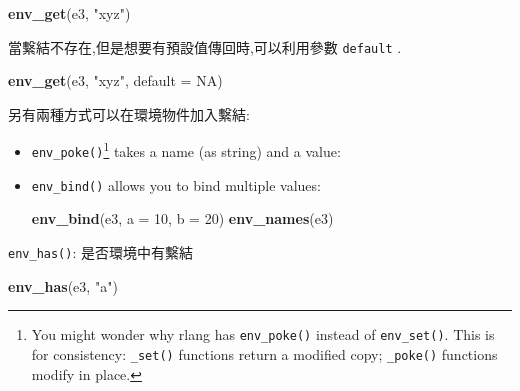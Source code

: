 \documentclass[]{book}
\newenvironment{Shaded}{\begin{snugshade}}{\end{snugshade}}
\newcommand{\KeywordTok}[1]{\textcolor[rgb]{0.13,0.29,0.53}{\textbf{#1}}}
\newcommand{\DataTypeTok}[1]{\textcolor[rgb]{0.13,0.29,0.53}{#1}}
\newcommand{\DecValTok}[1]{\textcolor[rgb]{0.00,0.00,0.81}{#1}}
\newcommand{\StringTok}[1]{\textcolor[rgb]{0.31,0.60,0.02}{#1}}
\newcommand{\OtherTok}[1]{\textcolor[rgb]{0.56,0.35,0.01}{#1}}
\newcommand{\OperatorTok}[1]{\textcolor[rgb]{0.81,0.36,0.00}{\textbf{#1}}}
\newcommand{\NormalTok}[1]{#1}
\let\rmarkdownfootnote\footnote%
\def\footnote{\protect\rmarkdownfootnote}
\theoremstyle{definition}
\theoremstyle{definition}
\theoremstyle{definition}
\theoremstyle{remark}
\begin{document}
\begin{Shaded}
\begin{Highlighting}[]
\KeywordTok{env_get}\NormalTok{(e3, }\StringTok{"xyz"}\NormalTok{)}
\end{Highlighting}
\end{Shaded}

當繫結不存在,但是想要有預設值傳回時,可以利用參數 \texttt{default} .

\begin{Shaded}
\begin{Highlighting}[]
\KeywordTok{env_get}\NormalTok{(e3, }\StringTok{"xyz"}\NormalTok{, }\DataTypeTok{default =} \OtherTok{NA}\NormalTok{)}
\end{Highlighting}
\end{Shaded}

另有兩種方式可以在環境物件加入繫結:

\begin{itemize}
\item
  \texttt{env\_poke()}\footnote{You might wonder why rlang has
    \texttt{env\_poke()} instead of \texttt{env\_set()}. This is for
    consistency: \texttt{\_set()} functions return a modified copy;
    \texttt{\_poke()} functions modify in place.} takes a name (as
  string) and a value:

\begin{Shaded}
\end{Shaded}
\item
  \texttt{env\_bind()} allows you to bind multiple values:

\begin{Shaded}
\begin{Highlighting}[]
\KeywordTok{env_bind}\NormalTok{(e3, }\DataTypeTok{a =} \DecValTok{10}\NormalTok{, }\DataTypeTok{b =} \DecValTok{20}\NormalTok{)}
\KeywordTok{env_names}\NormalTok{(e3)}
\end{Highlighting}
\end{Shaded}
\end{itemize}

\texttt{env\_has()}: 是否環境中有繫結

\begin{Shaded}
\begin{Highlighting}[]
\KeywordTok{env_has}\NormalTok{(e3, }\StringTok{"a"}\NormalTok{)}
\end{Highlighting}
\end{Shaded}
\end{document}
